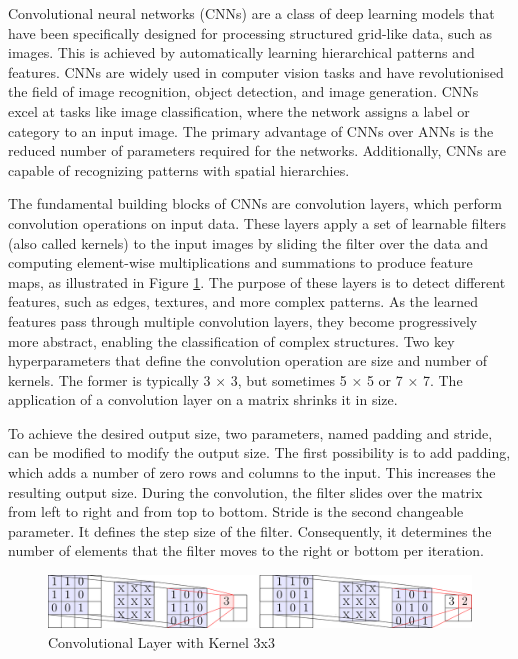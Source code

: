 \documentclass[
a4paper, 
12pt,
grayscalebody, %
abstract=on,
twoside, BCOR10mm, 12pt, DIV13,headinclude, footexclude, final, abstracton, openright
]{ibireprt}
\numberwithin{equation}{chapter}
\numberwithin{table}{chapter}
\numberwithin{figure}{chapter}
\numberwithin{algorithm}{chapter}
\numberwithin{example}{chapter}
\numberwithin{example}{chapter}
\begin{document}
Convolutional neural networks (CNNs) are a class of deep learning models that have been specifically designed for processing structured grid-like data, such as images. This is achieved by automatically learning hierarchical patterns and features. CNNs are widely used in computer vision tasks and have revolutionised the field of image recognition, object detection, and image generation. CNNs excel at tasks like image classification, where the network assigns a label or category to an input image. The primary advantage of CNNs over ANNs is the reduced number of parameters required for the networks. Additionally, CNNs are capable of recognizing patterns with spatial hierarchies. 

The fundamental building blocks of CNNs are convolution layers, which perform convolution operations on input data. These layers apply a set of learnable filters (also called kernels) to the input images by sliding the filter over the data and computing element-wise multiplications and summations to produce feature maps, as illustrated in Figure \ref{fig:fig2}. The purpose of these layers is to detect different features, such as edges, textures, and more complex patterns. As the learned features pass through multiple convolution layers, they become progressively more abstract, enabling the classification of complex structures. Two key hyperparameters that define the convolution operation are size and number of kernels. The former is typically 3 × 3, but sometimes 5 × 5 or 7 × 7. The application of a convolution layer on a matrix shrinks it in size. 

To achieve the desired output size, two parameters, named padding and stride, can be modified to modify the output size. The first possibility is to add padding, which adds a number of zero rows and columns to the input. This increases the resulting output size. During the convolution, the filter slides over the matrix from left to right and from top to bottom. Stride is the second changeable parameter. It defines the step size of the filter. Consequently, it determines the number of elements that the filter moves to the right or bottom per iteration.


\begin{figure}[h]
	\center
	\includegraphics[width = 1 \textwidth]{3x3_conv_layer.png}%
	\caption{Convolutional Layer with Kernel 3x3}
	\label{fig:fig2}
\end{figure}
\end{document}
